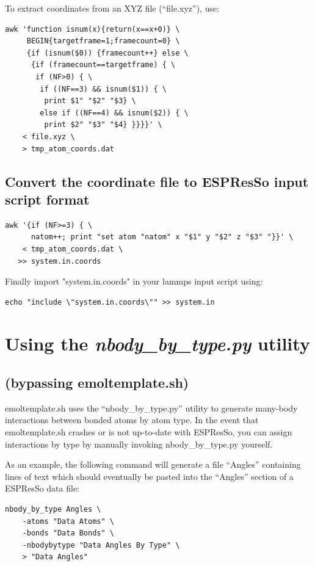 \documentclass[11pt]{article}
\begin{document}
To extract coordinates from an XYZ file (``file.xyz''), use:
\begin{verbatim}
awk 'function isnum(x){return(x==x+0)} \
     BEGIN{targetframe=1;framecount=0} \
     {if (isnum($0)) {framecount++} else \
      {if (framecount==targetframe) { \
       if (NF>0) { \
        if ((NF==3) && isnum($1)) { \
         print $1" "$2" "$3} \
        else if ((NF==4) && isnum($2)) { \
         print $2" "$3" "$4} }}}}' \
    < file.xyz \
    > tmp_atom_coords.dat
\end{verbatim}

\subsection{Convert the coordinate file to ESPResSo input script format}

\begin{verbatim}
awk '{if (NF>=3) { \
      natom++; print "set atom "natom" x "$1" y "$2" z "$3" "}}' \
    < tmp_atom_coords.dat \
   >> system.in.coords
\end{verbatim}
Finally import "system.in.coords" in your lammps input script using:
\begin{verbatim}
echo "include \"system.in.coords\"" >> system.in
\end{verbatim}


\section{Using the \textit{nbody\_by\_type.py} utility}
\subsection*{(bypassing emoltemplate.sh)}
\label{sec:nbody_by_type_utility}

emoltemplate.sh uses the ``nbody\_by\_type.py'' utility 
to generate many-body interactions between bonded atoms
by atom type.
In the event that emoltemplate.sh crashes or is not up-to-date with ESPResSo,
you can assign interactions by type by manually invoking nbody\_by\_type.py
yourself.


As an example, the following command will generate a file ``Angles''
containing lines of text which should eventually be pasted into the ``Angles''
section of a ESPResSo data file:
\begin{verbatim}
nbody_by_type Angles \
    -atoms "Data Atoms" \
    -bonds "Data Bonds" \
    -nbodybytype "Data Angles By Type" \
    > "Data Angles"
\end{verbatim}
\end{document}
